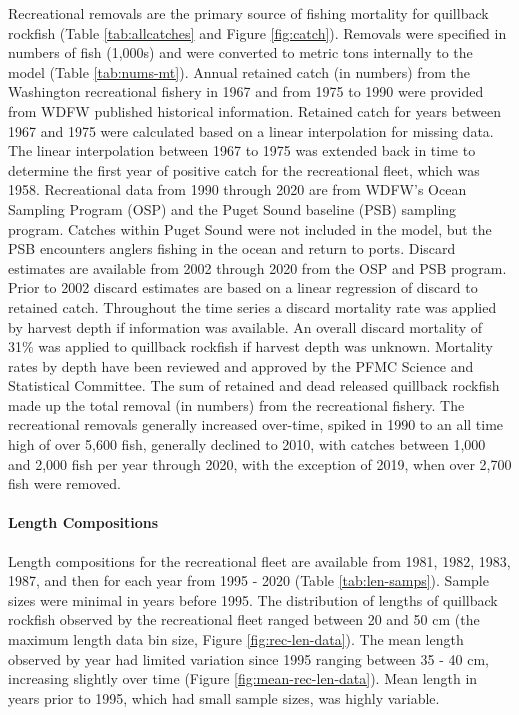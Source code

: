 \documentclass[11pt,
  english,
  a4paper,
]{article}
\begin{document}
Recreational removals are the primary source of fishing mortality for quillback rockfish (Table \ref{tab:allcatches} and Figure \ref{fig:catch}). Removals were specified in numbers of fish (1,000s) and were converted to metric tons internally to the model (Table \ref{tab:nums-mt}). Annual retained catch (in numbers) from the Washington recreational fishery in 1967 and from 1975 to 1990 were provided from WDFW published historical information. Retained catch for years between 1967 and 1975 were calculated based on a linear interpolation for missing data. The linear interpolation between 1967 to 1975 was extended back in time to determine the first year of positive catch for the recreational fleet, which was 1958. Recreational data from 1990 through 2020 are from WDFW's Ocean Sampling Program (OSP) and the Puget Sound baseline (PSB) sampling program. Catches within Puget Sound were not included in the model, but the PSB encounters anglers fishing in the ocean and return to ports. Discard estimates are available from 2002 through 2020 from the OSP and PSB program. Prior to 2002 discard estimates are based on a linear regression of discard to retained catch. Throughout the time series a discard mortality rate was applied by harvest depth if information was available. An overall discard mortality of 31\% was applied to quillback rockfish if harvest depth was unknown. Mortality rates by depth have been reviewed and approved by the PFMC Science and Statistical Committee. The sum of retained and dead released quillback rockfish made up the total removal (in numbers) from the recreational fishery. The recreational removals generally increased over-time, spiked in 1990 to an all time high of over 5,600 fish, generally declined to 2010, with catches between 1,000 and 2,000 fish per year through 2020, with the exception of 2019, when over 2,700 fish were removed.

\leavevmode\tagmcend\tagstructend\par


\hypertarget{length-compositions-1}{%
\paragraph{Length Compositions}\label{length-compositions-1}}

\leavevmode\tagmcend\tagstructend


Length compositions for the recreational fleet are available from 1981, 1982, 1983, 1987, and then for each year from 1995 - 2020 (Table \ref{tab:len-samps}). Sample sizes were minimal in years before 1995. The distribution of lengths of quillback rockfish observed by the recreational fleet ranged between 20 and 50 cm (the maximum length data bin size, Figure \ref{fig:rec-len-data}). The mean length observed by year had limited variation since 1995 ranging between 35 - 40 cm, increasing slightly over time (Figure \ref{fig:mean-rec-len-data}). Mean length in years prior to 1995, which had small sample sizes, was highly variable.
\end{document}
